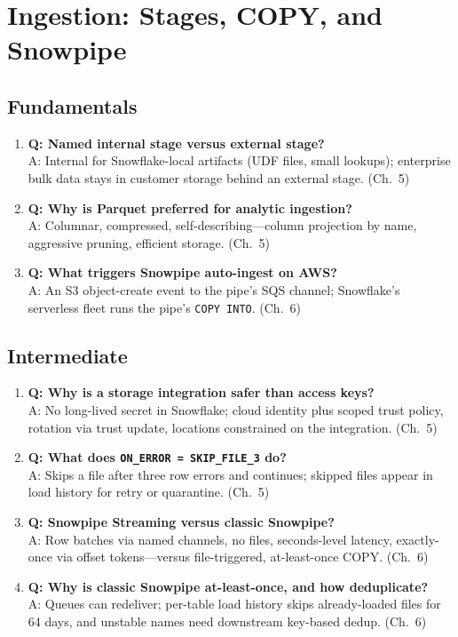 \section{Ingestion: Stages, COPY, and Snowpipe}

\subsection{Fundamentals}
\begin{enumerate}
    \item \textbf{Q: Named internal stage versus external stage?}\\
    A: Internal for Snowflake-local artifacts (UDF files, small lookups); enterprise bulk data stays in customer storage behind an external stage. (Ch.~5)
    \item \textbf{Q: Why is Parquet preferred for analytic ingestion?}\\
    A: Columnar, compressed, self-describing---column projection by name, aggressive pruning, efficient storage. (Ch.~5)
    \item \textbf{Q: What triggers Snowpipe auto-ingest on AWS?}\\
    A: An S3 object-create event to the pipe's SQS channel; Snowflake's serverless fleet runs the pipe's \texttt{COPY INTO}. (Ch.~6)
\end{enumerate}

\subsection{Intermediate}
\begin{enumerate}
    \item \textbf{Q: Why is a storage integration safer than access keys?}\\
    A: No long-lived secret in Snowflake; cloud identity plus scoped trust policy, rotation via trust update, locations constrained on the integration. (Ch.~5)
    \item \textbf{Q: What does \texttt{ON\_ERROR = SKIP\_FILE\_3} do?}\\
    A: Skips a file after three row errors and continues; skipped files appear in load history for retry or quarantine. (Ch.~5)
    \item \textbf{Q: Snowpipe Streaming versus classic Snowpipe?}\\
    A: Row batches via named channels, no files, seconds-level latency, exactly-once via offset tokens---versus file-triggered, at-least-once COPY. (Ch.~6)
    \item \textbf{Q: Why is classic Snowpipe at-least-once, and how deduplicate?}\\
    A: Queues can redeliver; per-table load history skips already-loaded files for 64 days, and unstable names need downstream key-based dedup. (Ch.~6)
\end{enumerate}

